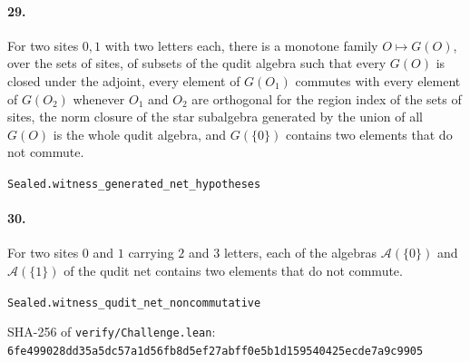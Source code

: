 \documentclass[11pt]{article}
\begin{document}
\paragraph{29.} For two sites $0, 1$ with two letters each, there is a monotone family $O \mapsto G(O)$, over the sets of sites, of subsets of the qudit algebra such that every $G(O)$ is closed under the adjoint, every element of $G(O_1)$ commutes with every element of $G(O_2)$ whenever $O_1$ and $O_2$ are orthogonal for the region index of the sets of sites, the norm closure of the star subalgebra generated by the union of all $G(O)$ is the whole qudit algebra, and $G(\{0\})$ contains two elements that do not commute.\par{\footnotesize\texttt{Sealed.witness\_generated\_net\_hypotheses}}

\paragraph{30.} For two sites $0$ and $1$ carrying $2$ and $3$ letters, each of the algebras $\mathcal A(\{0\})$ and $\mathcal A(\{1\})$ of the qudit net contains two elements that do not commute.\par{\footnotesize\texttt{Sealed.witness\_qudit\_net\_noncommutative}}

\vfill{\footnotesize SHA-256 of \texttt{verify/Challenge.lean}: \texttt{6fe499028dd35a5dc57a1d56fb8d5ef27abff0e5b1d159540425ecde7a9c9905}}
\end{document}
